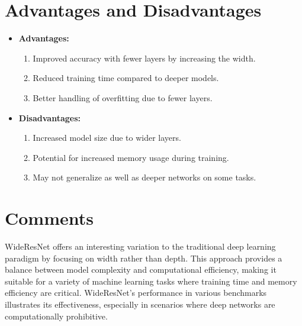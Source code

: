 \section{Advantages and Disadvantages}
\begin{itemize}
    \item \textbf{Advantages:}
    \begin{enumerate}
        \item Improved accuracy with fewer layers by increasing the width.
        \item Reduced training time compared to deeper models.
        \item Better handling of overfitting due to fewer layers.
    \end{enumerate}
    \item \textbf{Disadvantages:}
    \begin{enumerate}
        \item Increased model size due to wider layers.
        \item Potential for increased memory usage during training.
        \item May not generalize as well as deeper networks on some tasks.
    \end{enumerate}
\end{itemize}

\section{Comments}
WideResNet offers an interesting variation to the traditional deep learning paradigm by focusing on width rather than depth. This approach provides a balance between model complexity and computational efficiency, making it suitable for a variety of machine learning tasks where training time and memory efficiency are critical. WideResNet's performance in various benchmarks illustrates its effectiveness, especially in scenarios where deep networks are computationally prohibitive.
